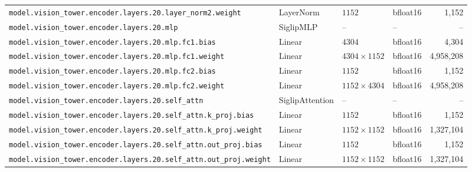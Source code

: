 \documentclass[10pt,a4paper]{article}
\theoremstyle{definition}
\begin{document}
\begin{appendices}
{\begin{longtable}{p{6.8cm}>{\raggedright\arraybackslash}p{3.3cm}llr}
\texttt{model.\allowbreak{}vision\_tower.\allowbreak{}encoder.\allowbreak{}layers.\allowbreak{}20.\allowbreak{}layer\_norm2.\allowbreak{}weight} & Layer\allowbreak{}Norm & $1152$ & bfloat16 & 1,152 \\
\texttt{model.\allowbreak{}vision\_tower.\allowbreak{}encoder.\allowbreak{}layers.\allowbreak{}20.\allowbreak{}mlp} & Siglip\allowbreak{}MLP & -- & -- & -- \\
\texttt{model.\allowbreak{}vision\_tower.\allowbreak{}encoder.\allowbreak{}layers.\allowbreak{}20.\allowbreak{}mlp.\allowbreak{}fc1.\allowbreak{}bias} & Linear & $4304$ & bfloat16 & 4,304 \\
\texttt{model.\allowbreak{}vision\_tower.\allowbreak{}encoder.\allowbreak{}layers.\allowbreak{}20.\allowbreak{}mlp.\allowbreak{}fc1.\allowbreak{}weight} & Linear & $4304 \times 1152$ & bfloat16 & 4,958,208 \\
\texttt{model.\allowbreak{}vision\_tower.\allowbreak{}encoder.\allowbreak{}layers.\allowbreak{}20.\allowbreak{}mlp.\allowbreak{}fc2.\allowbreak{}bias} & Linear & $1152$ & bfloat16 & 1,152 \\
\texttt{model.\allowbreak{}vision\_tower.\allowbreak{}encoder.\allowbreak{}layers.\allowbreak{}20.\allowbreak{}mlp.\allowbreak{}fc2.\allowbreak{}weight} & Linear & $1152 \times 4304$ & bfloat16 & 4,958,208 \\
\texttt{model.\allowbreak{}vision\_tower.\allowbreak{}encoder.\allowbreak{}layers.\allowbreak{}20.\allowbreak{}self\_attn} & Siglip\allowbreak{}Attention & -- & -- & -- \\
\texttt{model.\allowbreak{}vision\_tower.\allowbreak{}encoder.\allowbreak{}layers.\allowbreak{}20.\allowbreak{}self\_attn.\allowbreak{}k\_proj.\allowbreak{}bias} & Linear & $1152$ & bfloat16 & 1,152 \\
\texttt{model.\allowbreak{}vision\_tower.\allowbreak{}encoder.\allowbreak{}layers.\allowbreak{}20.\allowbreak{}self\_attn.\allowbreak{}k\_proj.\allowbreak{}weight} & Linear & $1152 \times 1152$ & bfloat16 & 1,327,104 \\
\texttt{model.\allowbreak{}vision\_tower.\allowbreak{}encoder.\allowbreak{}layers.\allowbreak{}20.\allowbreak{}self\_attn.\allowbreak{}out\_proj.\allowbreak{}bias} & Linear & $1152$ & bfloat16 & 1,152 \\
\texttt{model.\allowbreak{}vision\_tower.\allowbreak{}encoder.\allowbreak{}layers.\allowbreak{}20.\allowbreak{}self\_attn.\allowbreak{}out\_proj.\allowbreak{}weight} & Linear & $1152 \times 1152$ & bfloat16 & 1,327,104 \\

\end{longtable}}
\end{appendices}
\end{document}
